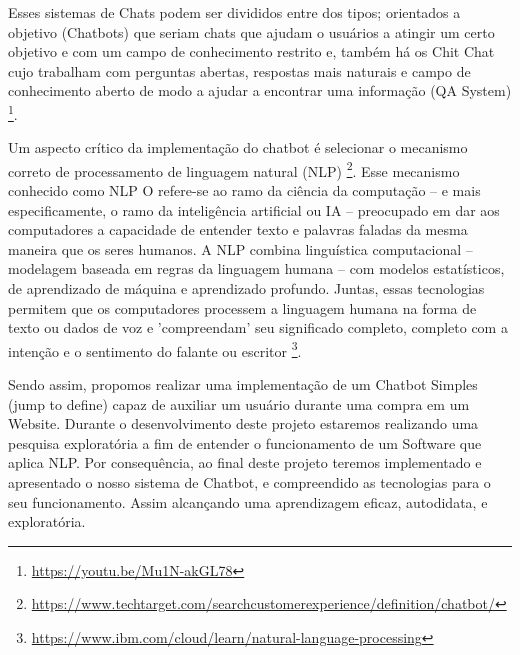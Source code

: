 \documentclass[
	12pt,				%
	openany,
	a4paper,			%
	english,			%
	french,				%
	spanish,			%
	brazil				%
	]{abntex2}
\begin{document}
Esses sistemas de Chats podem ser divididos entre dos tipos; orientados a objetivo (Chatbots) que seriam chats que ajudam o usuários a atingir um certo objetivo e com um campo de conhecimento restrito e, também há os Chit Chat cujo trabalham com perguntas abertas, respostas mais naturais e campo de conhecimento aberto de modo a ajudar a encontrar uma informação (QA System) \footnote{\url{https://youtu.be/Mu1N-akGL78}}.

Um aspecto crítico da implementação do chatbot é selecionar o mecanismo correto de processamento de linguagem natural (NLP) \footnote{\url{https://www.techtarget.com/searchcustomerexperience/definition/chatbot/}}.
Esse mecanismo conhecido como NLP O refere-se ao ramo da ciência da computação – e mais especificamente, o ramo da inteligência artificial ou IA – preocupado em dar aos computadores a capacidade de entender texto e palavras faladas da mesma maneira que os seres humanos.
A NLP combina linguística computacional – modelagem baseada em regras da linguagem humana – com modelos estatísticos, de aprendizado de máquina e aprendizado profundo. Juntas, essas tecnologias permitem que os computadores processem a linguagem humana na forma de texto ou dados de voz e 'compreendam' seu significado completo, completo com a intenção e o sentimento do falante ou escritor \footnote{\url{https://www.ibm.com/cloud/learn/natural-language-processing}}.

Sendo assim, propomos realizar uma implementação de um Chatbot Simples (jump to define) capaz de auxiliar um usuário durante uma compra em um Website. Durante o desenvolvimento deste projeto estaremos realizando uma pesquisa exploratória a fim de entender o funcionamento de um Software que aplica NLP.
Por consequência, ao final deste projeto teremos implementado e apresentado o nosso sistema de Chatbot, e compreendido as tecnologias para o seu funcionamento. Assim alcançando uma aprendizagem eficaz, autodidata, e exploratória.




%

\end{document}

